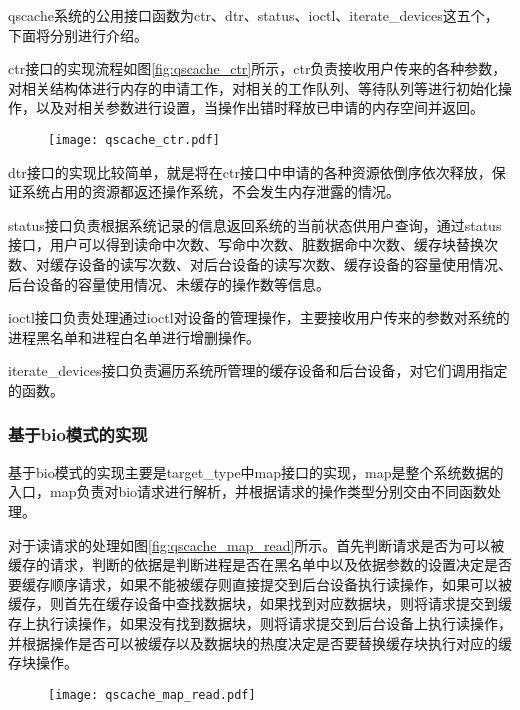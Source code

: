 qscache系统的公用接口函数为ctr、dtr、status、ioctl、iterate\_devices这五个，下面将分别进行介绍。

ctr接口的实现流程如图\ref{fig:qscache_ctr}所示，ctr负责接收用户传来的各种参数，对相关结构体进行内存的申请工作，对相关的工作队列、等待队列等进行初始化操作，以及对相关参数进行设置，当操作出错时释放已申请的内存空间并返回。

\begin{figure}[H]
    \centering
    \texttt{[image: qscache\_ctr.pdf]}
\end{figure}

dtr接口的实现比较简单，就是将在ctr接口中申请的各种资源依倒序依次释放，保证系统占用的资源都返还操作系统，不会发生内存泄露的情况。

status接口负责根据系统记录的信息返回系统的当前状态供用户查询，通过status接口，用户可以得到读命中次数、写命中次数、脏数据命中次数、缓存块替换次数、对缓存设备的读写次数、对后台设备的读写次数、缓存设备的容量使用情况、后台设备的容量使用情况、未缓存的操作数等信息。

ioctl接口负责处理通过ioctl对设备的管理操作，主要接收用户传来的参数对系统的进程黑名单和进程白名单进行增删操作。

iterate\_devices接口负责遍历系统所管理的缓存设备和后台设备，对它们调用指定的函数。

\subsubsection{基于bio模式的实现}

基于bio模式的实现主要是target\_type中map接口的实现，map是整个系统数据的入口，map负责对bio请求进行解析，并根据请求的操作类型分别交由不同函数处理。

对于读请求的处理如图\ref{fig:qscache_map_read}所示。首先判断请求是否为可以被缓存的请求，判断的依据是判断进程是否在黑名单中以及依据参数的设置决定是否要缓存顺序请求，如果不能被缓存则直接提交到后台设备执行读操作，如果可以被缓存，则首先在缓存设备中查找数据块，如果找到对应数据块，则将请求提交到缓存上执行读操作，如果没有找到数据块，则将请求提交到后台设备上执行读操作，并根据操作是否可以被缓存以及数据块的热度决定是否要替换缓存块执行对应的缓存块操作。

\begin{figure}[H]
    \centering
    \texttt{[image: qscache\_map\_read.pdf]}
\end{figure}

